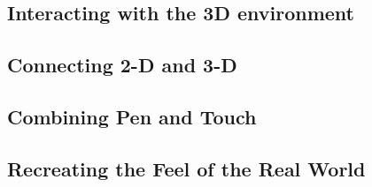 \documentclass{article}
\begin{document}
\subsection{Interacting with the 3D environment}

\subsection{Connecting 2-D and 3-D}

\subsection{Combining Pen and Touch}

\subsection{Recreating the Feel of the Real World}
 
\end{document}
